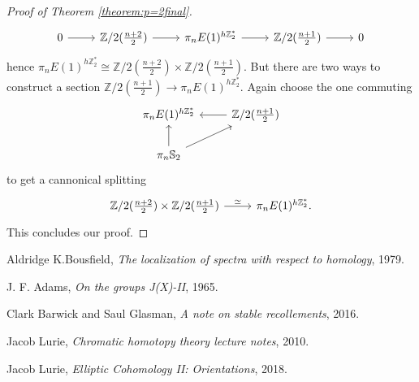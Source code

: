 \documentclass[a4paper]{article} %
\theoremstyle{definition}
\newcommand{\Z}{\mathbb{Z}}
\newcommand{\Sph}{\mathbb{S}}
\begin{document}
\begin{proof}[Proof of Theorem \ref{theorem:p=2final}]
\[\begin{tikzcd}
    0 \rar & \Z/2(\frac{n+2}{2}) \rar & \pi_nE(1)^{h\Z_2^*} \rar & \Z/2(\frac{n+1}{2}) \rar & 0
  \end{tikzcd}
  \]
  hence $\pi_nE(1)^{h\Z_2^*} \cong \Z/2(\frac{n+2}{2}) \times \Z/2 (\frac{n+1}{2})$. But there are two ways to construct a section $\Z/2(\frac{n+1}{2}) \to \pi_nE(1)^{h\Z_2^*}$. Again choose the one commuting
  \[
  \begin{tikzcd}
    \pi_nE(1)^{h\Z_2^*} & \Z/2(\frac{n+1}{2}) \lar \\
    \pi_n \Sph_2 \arrow{u} \arrow{ur} &
  \end{tikzcd}
  \]
  to get a cannonical splitting
  \[
  \begin{tikzcd}
    \Z/2(\frac{n+2}{2}) \times \Z/2(\frac{n+1}{2}) \rar{\simeq} & \pi_nE(1)^{h\Z_2^*}.
  \end{tikzcd}
  \]
  This concludes our proof.
\end{proof}

\begin{thebibliography}{9}

  Aldridge K.Bousfield,
  \textit{The localization of spectra with respect to homology},
  1979.

  J. F. Adams,
  \textit{On the groups J(X)-II},
  1965.

    Clark Barwick and Saul Glasman,
    \textit{A note on stable recollements},
    2016.

  Jacob Lurie,
  \textit{Chromatic homotopy theory lecture notes},
  2010.

    Jacob Lurie,
    \textit{Elliptic Cohomology II: Orientations},
    2018.

\end{thebibliography}
\end{document}
